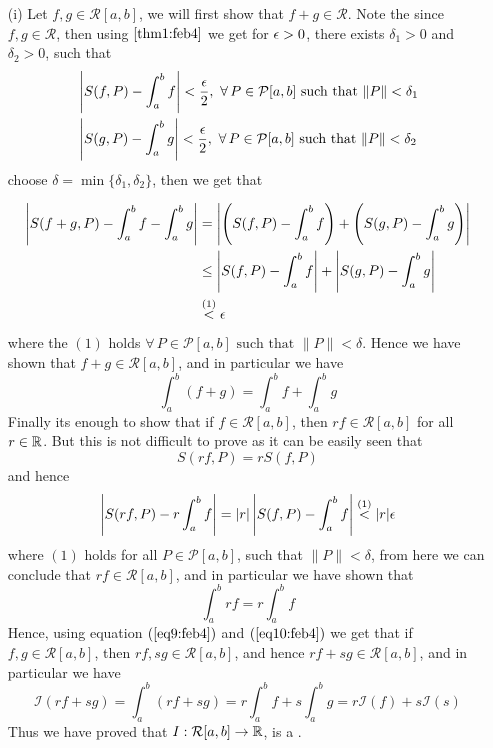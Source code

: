 \begin{prf}
\begin{enumerate}
    \item[(i)] Let $f,g \in \mathcal{R}[a,b]$, we will first show that $f+g \in \mathcal{R}$. Note the since $f,g \in \mathcal{R}$, then using  $\ref{thm1:feb4}$ we get for $\epsilon > 0$, there exists $\delta_1 > 0$ and $\delta_2 > 0$, such that 
    \begin{align*}
        &\left|S(f,P) - \int_a^b f \right| < \frac{\eps}{2}, \ \forall \, P \in \mathcal{P}[a,b] \mbox{ such that } \|P\| < \delta_1 \\ &\left|S(g,P) - \int_a^b g\right| < \frac{\eps}{2}, \ \forall \, P \in \mathcal{P}[a,b] \mbox{ such that } \|P\| < \delta_2 
    \end{align*}
    choose $\delta = \min \{\delta_1,\delta_2\}$, then we get that 

    \begin{align*}
        \left| S(f+g, P) - \int_a^b f - \int_a^b g \right| &= \left| \left(S(f,P) - \int_a^b f \right) + \left( S(g,P) - \int_a^b g \right) \right| \\ 
        &\leq \left| S(f,P) - \int_a^b f \right| + \left| S(g,P) - \int_a^b g \right| \\ 
        &\overset{(1)}{<} \epsilon 
    \end{align*}
    where the $(1)$ holds $\forall \, P \in \mathcal{P}[a,b] \mbox{ such that } \|P\| < \delta$. Hence we have shown that $f+g \in \mathcal{R}[a,b]$, and in particular we have 
    \begin{equation}\label{eq9:feb4}
        \int_a^b (f+g) = \int_a^b f + \int_a^b g 
    \end{equation}
    Finally its enough to show that if $f \in \mathcal{R}[a,b]$, then $rf \in \mathcal{R}[a,b]$ for all $r \in \mathbb{R}$. But this is not difficult to prove as it can be easily seen that 
    \[
        S(rf,P) = rS(f,P)    
    \]
    and hence 
    \begin{align*}
        \left| S(rf,P) - r \int_a^b f \right| = |r|\left| S(f,P) - \int_a^b f \right| \overset{(1)}{<} |r|\epsilon
    \end{align*}
    where $(1)$ holds for all $P \in \mathcal{P}[a,b]$, such that $\|P\| < \delta$, from here we can conclude that $rf \in \mathcal{R}[a,b]$, and in particular we have shown that
    \begin{equation}\label{eq10:feb4}
        \int_a^b rf = r \int_a^b f  
    \end{equation} 
    Hence, using equation $(\ref{eq9:feb4})$ and $(\ref{eq10:feb4})$ we get that if $f,g \in \mathcal{R}[a,b]$, then $rf,sg \in \mathcal{R}[a,b]$, and hence $rf+sg \in \mathcal{R}[a,b]$, and in particular we have 
    \[
        \mathcal{I}(rf+sg) = \int_a^b (rf+sg) = r\int_a^b f + s \int_a^b g = r\mathcal{I}(f) + s\mathcal{I}(s)
    \]
    Thus we have proved that $I : \mathcal{R}[a,b] \to \mathbb{R}$, is a .


\end{enumerate}
\end{prf}
